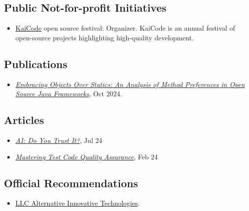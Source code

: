 \documentclass{vl}
\begin{document}
    \subsection*{Public Not-for-profit Initiatives}
    \begin{itemize}
        \itemsep0em
        \item \href{https://www.kaicode.org}{KaiCode} open source festival: Organizer.
        KaiCode is an annual festival of open-source projects highlighting high-quality development.
    \end{itemize}

    \subsection*{Publications}
    \begin{itemize}
        \itemsep0em
        \item\emph{\href{https://arxiv.org/abs/2410.05631}{Embracing Objects Over Statics:
        An Analysis of Method Preferences
        in Open Source Java Frameworks}}, Oct 2024.
    \end{itemize}

    \subsection*{Articles}
    \begin{itemize}
        \itemsep0em
        \item\emph{\href{https://dzone.com/articles/ai-do-you-trust-it}{AI: Do You Trust It?}}, Jul 24
        \item\emph{\href{https://dzone.com/articles/mastering-test-code-quality-assurance}{Mastering Test Code Quality
        Assurance}}, Feb 24
    \end{itemize}

    \subsection*{Official Recommendations}
    \begin{itemize}
        \itemsep0em
        \item \href{https://github.com/volodya-lombrozo/volodya-lombrozo.github.io/blob/24eb2bbed8fac71c90ddef6ff4d93de8fb4f9f26/_cv/recommendations/letter_of_recommendation_ait.pdf}{LLC Alternative Innovative Technologies}.
    \end{itemize}
\end{document}
